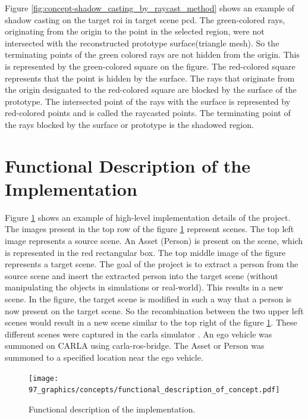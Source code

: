 Figure \ref{fig:concept-shadow_casting_by_raycast_method} shows an example of shadow casting on the target \acrshort{roi} in target scene \acrshort{pcd}. The green-colored rays, originating from the origin to the point in the selected region, were not intersected with the reconstructed prototype surface(triangle mesh). So the terminating points of the green colored rays are not hidden from the origin. This is represented by the green-colored square on the figure. The red-colored square represents that the point is hidden by the surface. The rays that originate from the origin designated to the red-colored square are blocked by the surface of the prototype. The intersected point of the rays with the surface is represented by red-colored points and is called the raycasted points. The terminating point of the rays blocked by the surface or prototype is the shadowed region.

\section{Functional Description of the Implementation}

Figure \ref{fig:functional_description_of_concept} shows an example of high-level implementation details of the project. The images present in the top row of the figure \ref{fig:functional_description_of_concept} represent scenes. The top left image represents a source scene. An Asset (Person) is present on the scene, which is represented in the red rectangular box. The top middle image of the figure represents a target scene. The goal of the project is to extract a person from the source scene and insert the extracted person into the target scene (without manipulating the objects in simulations or real-world). This results in a new scene. In the figure, the target scene is modified in such a way that a person is now present on the target scene. So the recombination between the two upper left scenes would result in a new scene similar to the top right of the figure \ref{fig:functional_description_of_concept}.
These different scenes were captured in the \acrfull{carla} simulator \parencite{Dosovitskiy17}. An ego vehicle was summoned on CARLA using carla-ros-bridge. The Asset or Person was summoned to a specified location near the ego vehicle.

\begin{figure}[htbp]
    \centering
    \texttt{[image: 97\_graphics/concepts/functional\_description\_of\_concept.pdf]}
    \caption{Functional description of the implementation.}
    \label{fig:functional_description_of_concept}
\end{figure}


